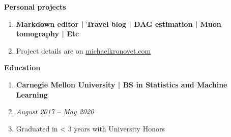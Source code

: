 \documentclass[letterpaper,11pt]{article}
\begin{document}
\begin{mybox}
	\hspace{-8pt} \textbf{\LARGE Personal projects}
\end{mybox}

\begin{enumerate}[leftmargin=10pt]
	\item[] \textbf{\Large Markdown editor | \textcolor{myBlue}{Travel blog} | DAG estimation | \textcolor{myBlue}{Muon tomography} | Etc}
	\item[] \large Project details are on \href{https://michaelkronovet.com}{\textcolor{myBlue}{michaelkronovet.com}}

\end{enumerate}


\begin{mybox}
	\hspace{-8pt} \textbf{\LARGE Education}
\end{mybox}

\begin{enumerate}[leftmargin=10pt]

	\item[] \textbf{\Large Carnegie Mellon University | \textcolor{myBlue}{BS in Statistics and Machine Learning}} \\
	\item[] \large \textit{\textcolor{myBlue}{August 2017 --} May 2020} \\
	\item[] \large Graduated in < 3 years with University Honors
\end{enumerate}
\end{document}
